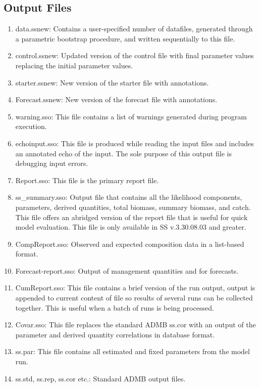 	\subsection{Output Files}
	\begin{enumerate}
		\item data.ss\textunderscore new: Contains a user-specified number of datafiles, generated through a parametric bootstrap procedure, and written sequentially to this file.
		\item control.ss\textunderscore new: Updated version of the control file with final parameter values replacing the initial parameter values.
		\item starter.ss\textunderscore new: New version of the starter file with annotations.
		\item Forecast.ss\textunderscore new: New version of the forecast file with annotations.
		\item warning.sso: This file contains a list of warnings generated during program execution.
		\item echoinput.sso: This file is produced while reading the input files and includes an annotated echo of the input. The sole purpose of this output file is debugging input errors.
		\item Report.sso: This file is the primary report file.
		\item ss\_summary.sso: Output file that contains all the likelihood components, parameters, derived quantities, total biomass, summary biomass, and catch. This file offers an abridged version of the report file that is useful for quick model evaluation. This file is only available in SS v.3.30.08.03 and greater.
		\item CompReport.sso: Observed and expected composition data in a list-based format.
		\item Forecast-report.sso: Output of management quantities and for forecasts.
		\item CumReport.sso: This file contains a brief version of the run output, output is appended to current content of file so results of several runs can be collected together.  This is useful when a batch of runs is being processed.
		\item Covar.sso: This file replaces the standard ADMB ss.cor with an output of the parameter and derived quantity correlations in database format.
		\item ss.par: This file contains all estimated and fixed parameters from the model run. 
		\item ss.std, ss.rep, ss.cor etc.:  Standard ADMB output files.

\end{enumerate}
